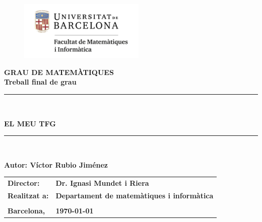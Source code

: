 \documentclass[11pt,a4paper,openright,oneside]{book}
\numberwithin{equation}{section}
\theoremstyle{definition}
\begin{document}

\thispagestyle{empty}

\begin{titlepage}
\begin{center}
\begin{figure}[htb]
\begin{center}
\includegraphics[width=6cm]{matematiquesinformatica-pos-rgb.png}
\end{center}
\end{figure}

\vspace*{1cm}
\textbf{\LARGE GRAU DE MATEM\`{A}TIQUES } \\
\vspace*{.5cm}
\textbf{\LARGE Treball final de grau} \\

\vspace*{1.5cm}
\rule{16cm}{0.1mm}\\
\begin{Huge}
\textbf{EL MEU TFG} \\
\end{Huge}
\rule{16cm}{0.1mm}\\

\vspace{1cm}

\begin{flushright}
\textbf{\LARGE Autor: Víctor Rubio Jiménez}

\vspace*{2cm}

\renewcommand{\arraystretch}{1.5}
\begin{tabular}{ll}
\textbf{\Large Director:} & \textbf{\Large Dr. Ignasi Mundet i Riera } \\
\textbf{\Large Realitzat a:} & \textbf{\Large  Departament de matemàtiques i informàtica   } \\
\\
\textbf{\Large Barcelona,} & \textbf{\Large \today }
\end{tabular}

\end{flushright}

\end{center}










\end{titlepage}
\end{document}
